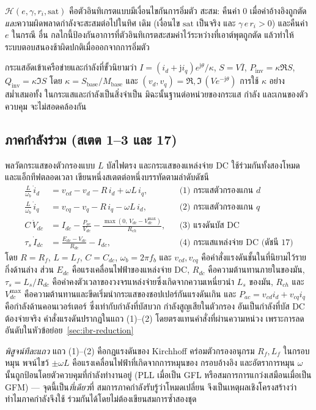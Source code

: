 \documentclass[12pt,a4paper]{article}
\begin{document}
$\mathcal{H}(e,\gamma,r_i,\text{sat})$ คือตัวอินทิเกรตแบบมีเงื่อนไขกันการอิ่มตัว
สะสม: คืนค่า $0$ เมื่อค่าอ้างอิงถูกตัด\emph{และ}ความผิดพลาดกำลังจะสะสมต่อไปในทิศ
เดิม (เงื่อนไข $\text{sat}$ เป็นจริง และ $\gamma\,e\,r_i>0$) และคืนค่า $e$ ในกรณี
อื่น กลไกนี้ป้องกันอาการที่ตัวอินทิเกรตสะสมค่าไว้ระหว่างที่เอาต์พุตถูกตัด แล้วทำให้
ระบบตอบสนองช้าผิดปกติเมื่อออกจากการอิ่มตัว

กระแสอัดเข้าเครือข่ายและกำลังที่ขั้วนิยามว่า
$I=(i_d+\mathrm{j}i_q)e^{\mathrm{j}\theta}/\kappa$, $S=V\overline{I}$,
$P_{\mathrm{inv}}=\kappa\Re S$, $Q_{\mathrm{inv}}=\kappa\Im S$ โดย
$\kappa=S_{\mathrm{base}}/M_{\mathrm{base}}$ และ
$(v_d,v_q)=\Re,\Im\,(Ve^{-\mathrm{j}\theta})$ การใช้ $\kappa$ อย่างสม่ำเสมอทั้ง
ในกระแสและกำลังเป็นสิ่งจำเป็น มิฉะนั้นฐานต่อหน่วยของกระแส กำลัง และเกนของตัวควบคุม
จะไม่สอดคล้องกัน

\subsection{ภาคกำลังร่วม (สเตต 1--3 และ 17)}
พลวัตกระแสของตัวกรองแบบ $L$ บัสไฟตรง และกระแสของแหล่งจ่าย DC ใช้ร่วมกันทั้งสองโหมด
และแอ็กทีฟตลอดเวลา เขียนหนึ่งสเตตต่อหนึ่งบรรทัดตามลำดับดัชนี
\begin{align}
  \tfrac{L}{\omega_b}\,\dot{i}_d &= v_{cd}-v_d-R\,i_d+\omega L\,i_q,
    &&\text{(1) กระแสตัวกรองแกน $d$}\\
  \tfrac{L}{\omega_b}\,\dot{i}_q &= v_{cq}-v_q-R\,i_q-\omega L\,i_d,
    &&\text{(2) กระแสตัวกรองแกน $q$}\\
  C\,\dot{V}_{dc} &= I_{dc}-\frac{P_{ac}}{V_{dc}}
      -\frac{\max(0,\,V_{dc}-V_{dc}^{\max})}{R_{ch}},
    &&\text{(3) แรงดันบัส DC}\\
  \tau_s\,\dot{I}_{dc} &= \frac{E_{dc}-V_{dc}}{R_{dc}}-I_{dc},
    &&\text{(4) กระแสแหล่งจ่าย DC (ดัชนี 17)}
\end{align}
โดย $R=R_f$, $L=L_f$, $C=C_{dc}$, $\omega_b=2\pi f_b$ และ $v_{cd},v_{cq}$ คือคำสั่งแรงดันชั้นในที่นิยามไว้รายกิ่งด้านล่าง
ส่วน $E_{dc}$ คือแรงเคลื่อนไฟฟ้าของแหล่งจ่าย DC, $R_{dc}$ คือความต้านทานภายในของมัน,
$\tau_s=L_s/R_{dc}$ คือค่าคงตัวเวลาของวงจรแหล่งจ่ายซึ่งเกิดจากความเหนี่ยวนำ $L_s$ ของมัน,
$R_{ch}$ และ $V_{dc}^{\max}$ คือความต้านทานและขีดเริ่มนำกระแสของชอปเปอร์กันแรงดันเกิน
และ $P_{ac}=v_{cd}i_d+v_{cq}i_q$ คือกำลังด้านคอนเวอร์เตอร์ ซึ่งเท่ากับกำลังที่บัสบวก
กำลังสูญเสียในตัวกรอง อันเป็นกำลังที่บัส DC ต้องจ่ายจริง คำสั่งแรงดันปรากฏในแถว (1)--(2)
โดยตรงแทนคำสั่งที่ผ่านความหน่วง เพราะการลดอันดับในหัวข้อย่อย~\ref{sec:ibr-reduction}

\emph{พิสูจน์ทีละแถว} แถว (1)--(2) คือกฎแรงดันของ Kirchhoff คร่อมตัวกรองอนุกรม
$R_f,L_f$ ในกรอบหมุน พจน์ไขว้ $\pm\omega L$ คือแรงเคลื่อนไฟฟ้าที่เกิดจากการหมุนของ
กรอบอ้างอิง และอัตราการหมุน $\omega$ นั้นถูกป้อนโดยตัวควบคุมที่กำลังทำงานอยู่ (PLL
เมื่อเป็น GFL หรือสมการการแกว่งเสมือนเมื่อเป็น GFM) --- จุดนี้เป็น\emph{ที่เดียว}ที่
สมการภาคกำลังรับรู้ว่าโหมดเปลี่ยน จึงเป็นเหตุผลเชิงโครงสร้างว่าทำไมภาคกำลังจึงใช้
ร่วมกันได้โดยไม่ต้องเขียนสมการซ้ำสองชุด
\end{document}
